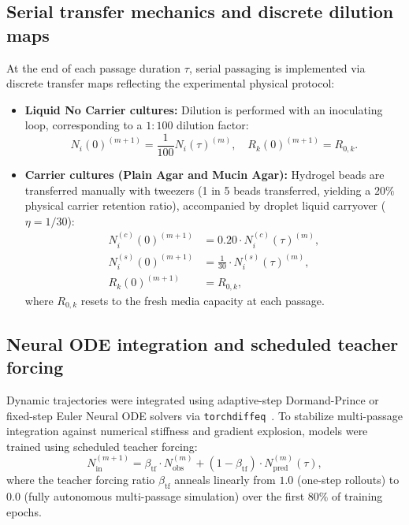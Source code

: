 \subsection*{Serial transfer mechanics and discrete dilution maps}
At the end of each passage duration $\tau$, serial passaging is implemented via discrete transfer maps reflecting the experimental physical protocol:
\begin{itemize}
    \item \textbf{Liquid No Carrier cultures:} Dilution is performed with an inoculating loop, corresponding to a $1:100$ dilution factor:
    \begin{equation}
    N_i(0)^{(m+1)} = \frac{1}{100} N_i(\tau)^{(m)}, \quad R_k(0)^{(m+1)} = R_{0, k}.
    \end{equation}
    \item \textbf{Carrier cultures (Plain Agar and Mucin Agar):} Hydrogel beads are transferred manually with tweezers (1 in 5 beads transferred, yielding a $20\%$ physical carrier retention ratio), accompanied by droplet liquid carryover ($\eta = 1/30$):
    \begin{align}
    N_i^{(c)}(0)^{(m+1)} &= 0.20 \cdot N_i^{(c)}(\tau)^{(m)}, \\
    N_i^{(s)}(0)^{(m+1)} &= \frac{1}{30} \cdot N_i^{(s)}(\tau)^{(m)}, \\
    R_k(0)^{(m+1)} &= R_{0, k},
    \end{align}
    where $R_{0, k}$ resets to the fresh media capacity at each passage.
\end{itemize}

\subsection*{Neural ODE integration and scheduled teacher forcing}
Dynamic trajectories were integrated using adaptive-step Dormand-Prince or fixed-step Euler Neural ODE solvers via \texttt{torchdiffeq}~\cite{chen2018neural}. To stabilize multi-passage integration against numerical stiffness and gradient explosion, models were trained using scheduled teacher forcing:
\begin{equation}
N_{\text{in}}^{(m+1)} = \beta_{\text{tf}} \cdot N_{\text{obs}}^{(m)} + (1 - \beta_{\text{tf}}) \cdot N_{\text{pred}}^{(m)}(\tau),
\end{equation}
where the teacher forcing ratio $\beta_{\text{tf}}$ anneals linearly from $1.0$ (one-step rollouts) to $0.0$ (fully autonomous multi-passage simulation) over the first $80\%$ of training epochs.

